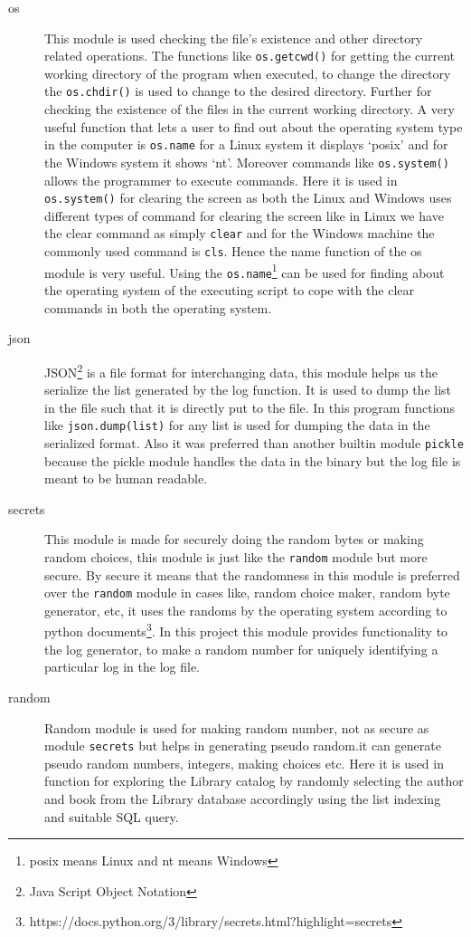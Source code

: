 \documentclass[12pt, a4paper, titlepage, openany]{report}
\begin{document}
\begin{description}
\item[os] This module is used checking the file's existence and other directory related operations. The functions like \verb+os.getcwd()+ for getting the current working directory of the program when executed, to change the directory the \verb+os.chdir()+ is used to change to the desired directory. Further for checking the existence of the files in the current working directory. A very useful function that lets a user to find out about the operating system type in the computer is \verb+os.name+ for a Linux system it displays `posix' and for the Windows system it shows `nt'. Moreover commands like \verb+os.system()+ allows the programmer to execute commands. Here it is used in \verb+os.system()+ for clearing the screen as both the Linux and Windows uses different types of command for clearing the screen like in Linux we have the clear command as simply \verb+clear+ and for the Windows machine the commonly used command is \verb+cls+. Hence the name function of the os module is very useful. Using the \verb+os.name+\footnote{posix means Linux and nt means Windows} can be used for finding about the operating system of the executing script to cope with the clear commands in both the operating system.
\item[json] JSON\footnote{Java Script Object Notation} is a file format for interchanging data, this module helps us the serialize the list generated by the log function. It is used to dump the list in the file such that it is directly put to the file. In this program functions like \verb+json.dump(list)+ for any list is used for dumping the data in the serialized format. Also it was preferred than another builtin module \verb+pickle+ because the pickle module handles the data in the binary but the log file is meant to be human readable.
\item [secrets] This module is made for securely doing the random bytes or making random choices, this module is just like the \verb+random+ module but more secure. By secure it means that the randomness in this module is preferred over the \verb+random+ module in cases like, random choice maker, random byte generator, etc, it uses the randoms by the operating system according to python documents\footnote{https://docs.python.org/3/library/secrets.html?highlight=secrets}. In this project this module provides functionality to the log generator, to make a random number for uniquely identifying a particular log in the log file.
\item[random] Random module is used for making random number, not as secure as module \verb+secrets+ but helps in generating pseudo random.it can generate pseudo random numbers, integers, making choices etc. Here it is used in function for exploring the Library catalog by randomly selecting the author and book from the Library database accordingly using the list indexing and suitable SQL query.

\end{description}
\end{document}
